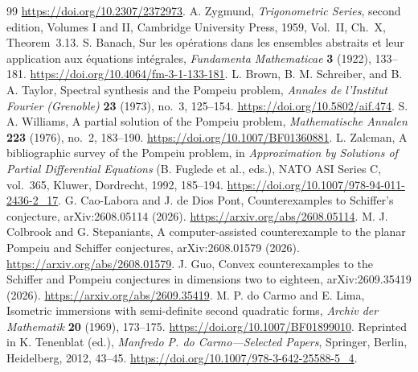 \begin{thebibliography}{99}
\url{https://doi.org/10.2307/2372973}.
A. Zygmund, \emph{Trigonometric Series}, second edition, Volumes I and II,
Cambridge University Press, 1959, Vol.~II, Ch.~X, Theorem~3.13.
S. Banach, Sur les op\'erations dans les ensembles abstraits et leur
application aux \'equations int\'egrales,
\emph{Fundamenta Mathematicae} \textbf{3} (1922), 133--181.
\url{https://doi.org/10.4064/fm-3-1-133-181}.
L. Brown, B. M. Schreiber, and B. A. Taylor,
Spectral synthesis and the Pompeiu problem,
\emph{Annales de l'Institut Fourier (Grenoble)} \textbf{23} (1973),
no.~3, 125--154. \url{https://doi.org/10.5802/aif.474}.
S. A. Williams, A partial solution of the Pompeiu problem,
\emph{Mathematische Annalen} \textbf{223} (1976), no.~2, 183--190.
\url{https://doi.org/10.1007/BF01360881}.
L. Zalcman, A bibliographic survey of the Pompeiu problem,
in \emph{Approximation by Solutions of Partial Differential Equations}
(B. Fuglede et al., eds.), NATO ASI Series C, vol.~365,
Kluwer, Dordrecht, 1992, 185--194.
\url{https://doi.org/10.1007/978-94-011-2436-2_17}.
G. Cao-Labora and J. de Dios Pont,
Counterexamples to Schiffer's conjecture, arXiv:2608.05114 (2026).
\url{https://arxiv.org/abs/2608.05114}.
M. J. Colbrook and G. Stepaniants,
A computer-assisted counterexample to the planar Pompeiu and Schiffer
conjectures, arXiv:2608.01579 (2026).
\url{https://arxiv.org/abs/2608.01579}.
J. Guo,
Convex counterexamples to the Schiffer and Pompeiu conjectures in
dimensions two to eighteen, arXiv:2609.35419 (2026).
\url{https://arxiv.org/abs/2609.35419}.
M. P. do Carmo and E. Lima,
Isometric immersions with semi-definite second quadratic forms,
\emph{Archiv der Mathematik} \textbf{20} (1969), 173--175.
\url{https://doi.org/10.1007/BF01899010}.
Reprinted in K. Tenenblat (ed.), \emph{Manfredo P. do Carmo---Selected Papers},
Springer, Berlin, Heidelberg, 2012, 43--45.
\url{https://doi.org/10.1007/978-3-642-25588-5_4}.
\end{thebibliography}
